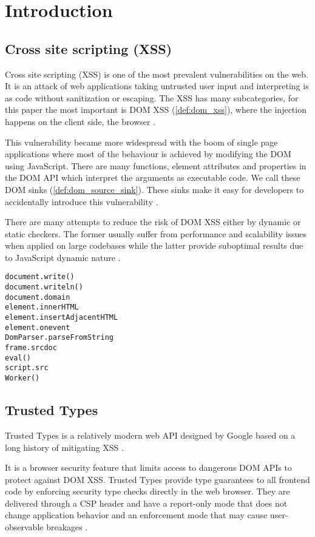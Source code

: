 \chapter{Introduction}

\section{Cross site scripting (XSS)}

Cross site scripting (XSS) is one of the most prevalent vulnerabilities on the web. It is an attack
of web applications taking untrusted user input and interpreting is as code without sanitization or
escaping. The XSS has many subcategories, for this paper the most important is DOM XSS
(\ref{def:dom_xss}), where the injection happens on the client side, the browser
\cite{tt_web_framework_paper}.

This vulnerability became more widespread with the boom of single page applications where most of
the behaviour is achieved by modifying the DOM using JavaScript. There are many functions, element
attributes and properties in the DOM API which interpret the arguments as executable code. We call
these DOM sinks (\ref{def:dom_source_sink}). These sinks make it easy for developers to accidentally
introduce this vulnerability \cite{tt_web_framework_paper}.

There are many attempts to reduce the risk of DOM XSS either by dynamic or static checkers. The
former usually suffer from performance and scalability issues when applied on large codebases while
the latter provide suboptimal results due to JavaScript dynamic nature
\cite{tt_web_framework_paper}.

\bigskip
\begin{lstlisting}[language={}, caption=Examples of DOM XSS attack vectors \cite{dom_xss_portswigger} \cite{tt_web_framework_paper}]
document.write()
document.writeln()
document.domain
element.innerHTML
element.insertAdjacentHTML
element.onevent
DomParser.parseFromString
frame.srcdoc
eval()
script.src
Worker()
\end{lstlisting}

\section{Trusted Types}

Trusted Types is a relatively modern web API designed by Google based on a long history of
mitigating XSS \cite{tt_design_history}.

It is a browser security feature that limits access to dangerous DOM APIs to protect against DOM
XSS. Trusted Types provide type guarantees to all frontend code by enforcing security type checks
directly in the web browser. They are delivered through a CSP header and have a report-only mode
that does not change application behavior and an enforcement mode that may cause user-observable
breakages \cite{tt_background}.

